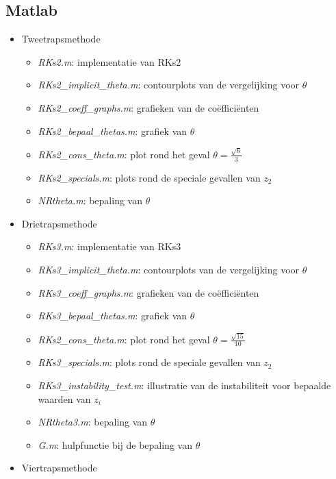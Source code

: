 \documentclass[12pt]{article}
\begin{document}
\subsection*{Matlab}
\begin{itemize}
    \item Tweetrapsmethode
    \begin{itemize}
        \item \textit{RKs2.m}: implementatie van RKs2
        \item \textit{RKs2\_implicit\_theta.m}: contourplots van de vergelijking voor \(\theta\)
        \item \textit{RKs2\_coeff\_graphs.m}: grafieken van de coëfficiënten
        \item \textit{RKs2\_bepaal\_thetas.m}: grafiek van \(\theta\)
        \item \textit{RKs2\_cons\_theta.m}: plot rond het geval \(\theta=\frac{\sqrt{6}}{3}\)
        \item \textit{RKs2\_specials.m}: plots rond de speciale gevallen van \(z_2\)
        \item \textit{NRtheta.m}: bepaling van \(\theta\)
    \end{itemize}
    \item Drietrapsmethode
    \begin{itemize}
        \item \textit{RKs3.m}: implementatie van RKs3
        \item \textit{RKs3\_implicit\_theta.m}: contourplots van de vergelijking voor \(\theta\)
        \item \textit{RKs3\_coeff\_graphs.m}: grafieken van de coëfficiënten
        \item \textit{RKs3\_bepaal\_thetas.m}: grafiek van \(\theta\)
        \item \textit{RKs2\_cons\_theta.m}: plot rond het geval \(\theta=\frac{\sqrt{15}}{10}\)
        \item \textit{RKs3\_specials.m}: plots rond de speciale gevallen van \(z_2\)
        \item \textit{RKs3\_instability\_test.m}: illustratie van de instabiliteit voor bepaalde waarden van \(z_i\)
        \item \textit{NRtheta3.m}: bepaling van \(\theta\)
        \item \textit{G.m}: hulpfunctie bij de bepaling van \(\theta\)
    \end{itemize}
    \item Viertrapsmethode
    \begin{itemize}

\end{itemize}
\end{itemize}
\end{document}
